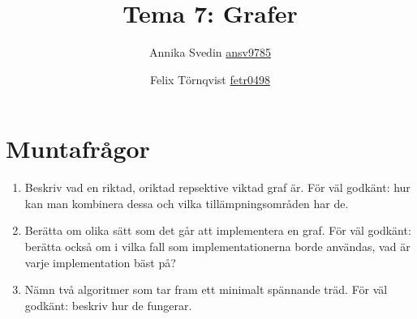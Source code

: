 \documentclass[a5paper,10pt,oneside]{article}
\title{Tema 7: Grafer}
\author{Annika Svedin \url{ansv9785} \and Felix Törnqvist \url{fetr0498}}
\begin{document}
\maketitle

\section*{Muntafrågor}

\begin{enumerate}
	\item Beskriv vad en riktad, oriktad repsektive viktad graf är. För väl godkänt: hur kan man kombinera dessa och vilka tillämpningsområden har de.
	
	\item Berätta om olika sätt som det går att implementera en graf. För väl godkänt: berätta också om i vilka fall som implementationerna borde användas, vad är varje implementation bäst på?
	
	
	\item Nämn två algoritmer som tar fram ett minimalt spännande träd. För väl godkänt: beskriv hur de fungerar.
	
\end{enumerate}
\end{document}
